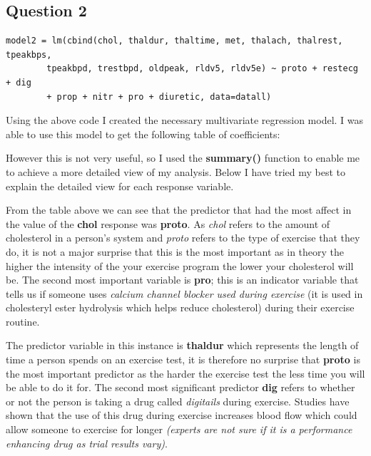 \documentclass[a4paper]{article}
\begin{document}
\newpage
\subsection{Question 2}

\begin{lstlisting}[frame=single]
model2 = lm(cbind(chol, thaldur, thaltime, met, thalach, thalrest, tpeakbps,
		tpeakbpd, trestbpd, oldpeak, rldv5, rldv5e) ~ proto + restecg + dig
		+ prop + nitr + pro + diuretic, data=datall)
\end{lstlisting}

Using the above code I created the necessary multivariate regression model.
I was able to use this model to get the following table of coefficients:

However this is not very useful, so I used the \textbf{summary()} function to
enable me to achieve a more detailed view of my analysis. Below I have tried
my best to explain the detailed view for each response variable.

\newpage

From the table above we can see that the predictor that had the most
affect in the value of the \textbf{chol} response was \textbf{proto}. As
\textit{chol} refers to the amount of cholesterol in a person's system and
\textit{proto} refers to the type of exercise that they do, it is not a major
surprise that this is the most important as in theory the higher the intensity
of the your exercise program the lower your cholesterol will be. The second most
important variable is \textbf{pro}; this is an indicator variable that tells us
if someone uses \textit{calcium channel blocker used during exercise} (it is
used in cholesteryl ester hydrolysis which helps reduce cholesterol) during
their exercise routine.

\newpage

The predictor variable in this instance is \textbf{thaldur} which represents the
length of time a person spends on an exercise test, it is therefore no surprise
that \textbf{proto} is the most important predictor as the harder the exercise
test the less time you will be able to do it for. The second most significant
predictor \textbf{dig} refers to whether or not the person is taking a drug
called \textit{digitails} during exercise. Studies have shown that the use of
this drug during exercise increases blood flow which could allow someone to
exercise for longer \textit{(experts are not sure if it is a performance
enhancing drug as trial results vary)}.
\end{document}
